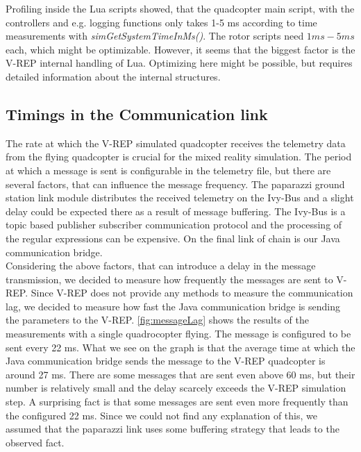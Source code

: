  Profiling inside the Lua scripts showed, that the quadcopter main script, with the controllers and e.g. logging functions only takes 1-5 ms according to time measurements with  \emph{simGetSystemTimeInMs()}.
 The rotor scripts need $1ms - 5ms$ each, which might be optimizable.
 However, it seems that the biggest factor is the V-REP internal handling of Lua.
 Optimizing here might be possible, but requires detailed information about the internal structures.


 

\subsection{Timings in the Communication link}
\label{sec:commTiming}


The rate at which the V-REP simulated quadcopter receives the telemetry data from the flying quadcopter is crucial for the mixed reality simulation. 
The period at which a message is sent is configurable in the telemetry file, but there are several factors, that can influence the message frequency. 
The paparazzi ground station link module distributes the received telemetry on the Ivy-Bus and a slight delay could be expected there as a result of message buffering. 
The Ivy-Bus is a topic based publisher subscriber communication protocol and the processing of the regular expressions can be expensive. 
On the final link of chain is our Java communication bridge.\\

Considering the above factors, that can introduce a delay in the message transmission, we decided to measure how frequently the messages are sent to V-REP. 
Since V-REP does not provide any methods to measure the communication lag, we decided to measure how fast the Java communication bridge is sending the parameters to the V-REP. 
\ref{fig:messageLag} shows the results of the measurements with a single quadrocopter flying. 
The message is configured to be sent every 22 ms. 
What we see on the graph is that the average time at which the Java communication bridge sends the message to the V-REP quadcopter is around 27 ms. 
There are some messages that are sent even above 60 ms, but their number is relatively small and the delay scarcely exceeds the V-REP simulation step. 
A surprising fact is that some messages are sent even more frequently than the configured 22 ms. 
Since we could not find any explanation of this, we assumed that the paparazzi link uses some buffering strategy that leads to the observed fact. \\

